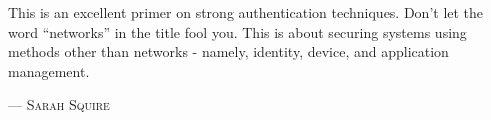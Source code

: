 This is an excellent primer on strong authentication techniques. Don’t let the word “networks” in the title fool you. This is about securing systems using methods other than networks - namely, identity, device, and application management. 
\setlength{\parindent}{0cm}\par\textsc{ --- Sarah Squire }\par\vspace{12pt}\setlength{\parindent}{15pt}
